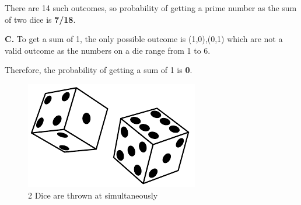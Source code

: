 \documentclass{IEEEtran}
\begin{document}
\bigskip

There are 14 such outcomes, so probability of getting a prime number as the sum of two dice is \textbf{7/18}.

\bigskip

\textbf{C.}
To get a sum of 1, the only possible outcome is (1,0),(0,1) which are not a valid outcome as the numbers on a die range from 1 to 6. \newline

\bigskip

Therefore, the probability of getting a sum of 1 is \textbf{0}.


\begin{figure}[!ht]
    \center
    \includegraphics[width=0.8\columnwidth]{figs/dice.png}
    \caption{\label{schema}2 Dice are thrown at simultaneously}
  \end{figure}



		
\end{document}
